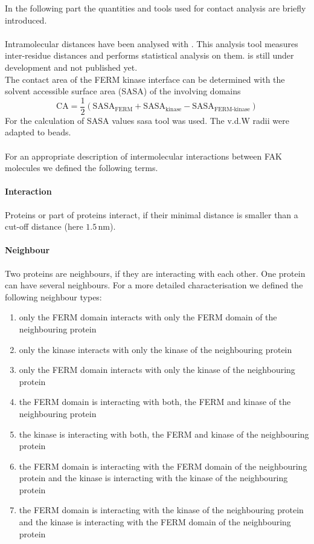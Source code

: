 In the following part the quantities and tools used for contact analysis are briefly introduced.\\
\\
Intramolecular distances have been analysed with \conan{}. This analysis tool measures inter-residue distances and performs statistical analysis on them. \conan{} is still under development and not published yet.\\%
The contact area of the FERM kinase interface can be determined with the solvent accessible surface area (SASA) of the involving domains
\begin{equation}
\text{CA} = \frac{1}{2} \left(\text{SASA}_\text{FERM} + \text{SASA}_\text{kinase} - \text{SASA}_\text{FERM-kinase}\right)
\end{equation}
For the calculation of SASA values \gromacs{} sasa tool was used. The v.d.W radii were adapted to \martini{} beads.\\
\\
For an appropriate description of intermolecular interactions between FAK molecules we defined the following terms.
\paragraph{Interaction} Proteins or part of proteins interact, if their minimal distance is smaller than a cut-off distance (here $1.5\,\si{\nano\metre}$).
\paragraph{Neighbour} Two proteins are neighbours, if they are interacting with each other. One protein can have several neighbours. For a more detailed characterisation we defined the following neighbour types:
\begin{enumerate}[label={type \theenumi:}, leftmargin=*]
	\setcounter{enumi}{0}
	\item only the FERM domain interacts with only the FERM domain of the neighbouring protein
	\item only the kinase interacts with only the kinase of the neighbouring protein
	\item only the FERM domain interacts with only the kinase of the neighbouring protein
	\item the FERM domain is interacting with both, the FERM and kinase of the neighbouring protein
	\item the kinase is interacting with both, the FERM and kinase of the neighbouring protein
	\item the FERM domain is interacting with the FERM domain of the neighbouring protein and the kinase is interacting with the kinase of the neighbouring protein
	\item the FERM domain is interacting with the kinase of the neighbouring protein and the kinase is interacting with the FERM domain of the neighbouring protein
\end{enumerate}
